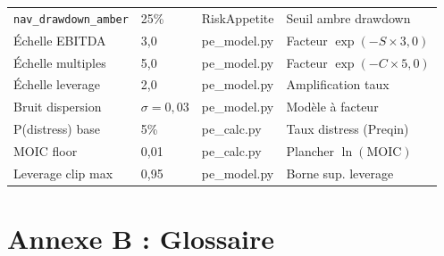 \documentclass[12pt,a4paper]{article}
\begin{document}
\begin{longtable}{llll}
\texttt{nav\_drawdown\_amber} & 25\% & RiskAppetite & Seuil ambre drawdown \\
\'{E}chelle EBITDA & 3{,}0 & pe\_model.py & Facteur $\exp(-S \times 3{,}0)$ \\
\'{E}chelle multiples & 5{,}0 & pe\_model.py & Facteur $\exp(-C \times 5{,}0)$ \\
\'{E}chelle leverage & 2{,}0 & pe\_model.py & Amplification taux \\
Bruit dispersion & $\sigma = 0{,}03$ & pe\_model.py & Mod\`{e}le \`{a} facteur \\
P(distress) base & 5\% & pe\_calc.py & Taux distress (Preqin) \\
MOIC floor & 0{,}01 & pe\_calc.py & Plancher $\ln(\mathrm{MOIC})$ \\
Leverage clip max & 0{,}95 & pe\_model.py & Borne sup. leverage \\
\bottomrule
\end{longtable}


\section{Annexe B : Glossaire}
\label{sec:glossaire}
\end{document}
